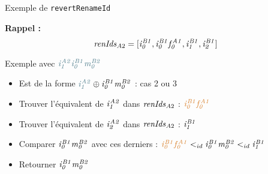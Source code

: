 \begin{frame}[fragile]{Exemple de \texttt{revertRenameId}}
\begin{figure}
{
    }
  \end{figure}
  \textbf{Rappel : }
  \begin{equation*}
      \mathit{renIds}_{A2} = [\mathit{i}^{\mathit{B1}}_{\mathit{0}},\mathit{i}^{\mathit{B1}}_{\mathit{0}}\mathit{f}^{\mathit{A1}}_{\mathit{0}},\mathit{i}^{\mathit{B1}}_{\mathit{1}},\mathit{i}^{\mathit{B1}}_{\mathit{2}}]
  \end{equation*}
  \begin{block}{Exemple avec {$\coloridfour\id{i}{A2}{1}\id{i}{B1}{0}\id{m}{B2}{0}$}}
    \begin{itemize}
      \item<2-> Est de la forme ${\coloridfour\id{i}{A2}{1}} \oplus \id{i}{B1}{0}\id{m}{B2}{0}$ : cas 2 ou 3
      \item<3-> Trouver l'équivalent de $\mathit{i}^{\mathit{A2}}_{\mathit{1}}$ dans $\mathit{renIds}_{A2}$ : {$\coloridone\id{i}{B1}{0}\id{f}{A1}{0}$}
      \item<4-> Trouver l'équivalent de $\mathit{i}^{\mathit{A2}}_{\mathit{2}}$ dans $\mathit{renIds}_{A2}$ : $\mathit{i}^{\mathit{B1}}_{\mathit{1}}$
      \item<5-> Comparer $\mathit{i}^{\mathit{B1}}_{\mathit{0}}\mathit{m}^{\mathit{B2}}_{\mathit{0}}$ avec ces derniers : ${\coloridone\id{i}{B1}{0}\id{f}{A1}{0}} \lid \id{i}{B1}{0}\id{m}{B2}{0} \lid \id{i}{B1}{1}$
      \item<6-> Retourner $\mathit{i}^{\mathit{B1}}_{\mathit{0}}\mathit{m}^{\mathit{B2}}_{\mathit{0}}$
    \end{itemize}
  \end{block}
\end{frame}
